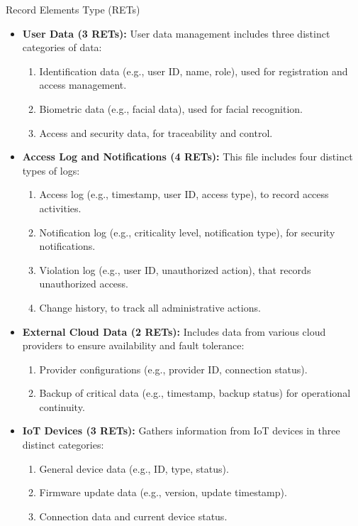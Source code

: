 \documentclass[12pt]{beamer}
\begin{document}
\begin{frame}[allowframebreaks]{Record Elements Type (RETs)}
\small

\begin{itemize}
    \item \textbf{User Data (3 RETs):} User data management includes three distinct categories of data:
    
    \begin{enumerate}
        \item Identification data (e.g., user ID, name, role), used for registration and access management.
        \item Biometric data (e.g., facial data), used for facial recognition.
        \item Access and security data, for traceability and control.
    \end{enumerate}

    \item \textbf{Access Log and Notifications (4 RETs):} This file includes four distinct types of logs:
    \begin{enumerate}
        \item Access log (e.g., timestamp, user ID, access type), to record access activities.
        \item Notification log (e.g., criticality level, notification type), for security notifications.
        \item Violation log (e.g., user ID, unauthorized action), that records unauthorized access.
        \item Change history, to track all administrative actions.
    \end{enumerate}

    \item \textbf{External Cloud Data (2 RETs):} Includes data from various cloud providers to ensure availability and fault tolerance:
    
    \begin{enumerate}
        \item Provider configurations (e.g., provider ID, connection status).
        \item Backup of critical data (e.g., timestamp, backup status) for operational continuity.
    \end{enumerate}

\framebreak

    \item \textbf{IoT Devices (3 RETs):} Gathers information from IoT devices in three distinct categories:
    
    \begin{enumerate}
        \item General device data (e.g., ID, type, status).
        \item Firmware update data (e.g., version, update timestamp).
        \item Connection data and current device status.
    \end{enumerate}
\end{itemize}
\end{frame}
\end{document}
